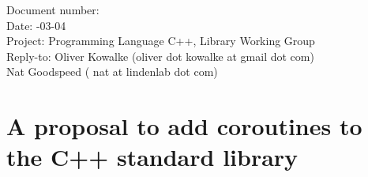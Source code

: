 \documentclass[a4paper,10pt,DIV15]{scrartcl}
\begin{document}
\small
\begin{tabbing}
    Document number: \=  \\
    Date:            -03-04 \\
    Project:         \> Programming Language C++, Library Working Group \\
    Reply-to:        \> Oliver Kowalke (oliver dot kowalke at gmail dot com)\\
                     \> Nat Goodspeed ( nat at lindenlab dot com)\\
\end{tabbing}

\section*{A proposal to add coroutines to the C++ standard library}


\tableofcontents










\end{document}
